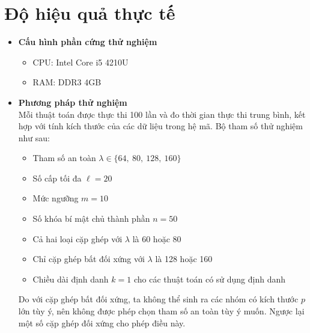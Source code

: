 \documentclass[class=report, crop=false]{standalone}
\begin{document}
	\newpage
	\section{Độ hiệu quả thực tế}	
		\begin{itemize}
			\item[] {\sffamily\bfseries Cấu hình phần cứng thử nghiệm}
			\begin{itemize}
				\item CPU: Intel Core i5 4210U
				\item RAM: DDR3 4GB
			\end{itemize}
			\item[] {\sffamily\bfseries Phương pháp thử nghiệm} \\
			Mỗi thuật toán được thực thi 100 lần và đo thời gian thực thi trung bình, kết hợp với tính kích thước của các dữ liệu trong hệ mã. Bộ tham số thử nghiệm như sau:
			\begin{itemize}
				\item Tham số an toàn $\lambda \in \{64,\ 80,\ 128,\ 160 \}$
				\item Số cấp tối đa $\ell = 20$
				\item Mức ngưỡng $m = 10$
				\item Số khóa bí mật chủ thành phần $n = 50$
				\item Cả hai loại cặp ghép với $\lambda$ là 60 hoặc 80
				\item Chỉ cặp ghép bất đối xứng với $\lambda$ là 128 hoặc 160
				\item Chiều dài định danh $k = 1$ cho các thuật toán có sử dụng định danh
			\end{itemize}
			Do với cặp ghép bất đối xứng, ta không thể sinh ra các nhóm có kích thước $p$ lớn tùy ý, nên không được phép chọn tham số an toàn tùy ý muốn. Ngược lại một số cặp ghép đối xứng cho phép điều này.


\end{itemize}
\end{document}
